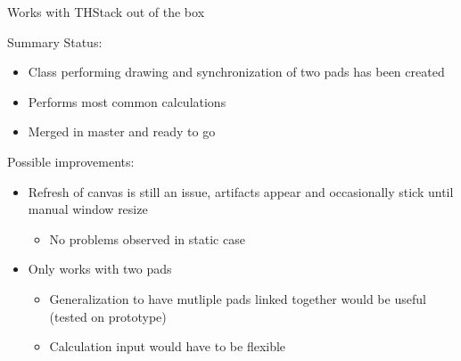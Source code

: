 \documentclass{beamer}
\begin{document}
\begin{frame}[t]{Works with THStack out of the box}
\end{frame}

\begin{frame}[t]{Summary}
  Status:
  \begin{itemize}
    \item Class performing drawing and synchronization of two pads has been created
    \item Performs most common calculations
    \item Merged in master and ready to go
  \end{itemize}
  Possible improvements:
  \begin{itemize}
    \item Refresh of canvas is still an issue, artifacts appear and occasionally stick until manual window resize
      \begin{itemize}
        \item No problems observed in static case
      \end{itemize} 
    \item Only works with two pads
      \begin{itemize}
        \item Generalization to have mutliple pads linked together would be useful (tested on prototype)
        \item Calculation input would have to be flexible
      \end{itemize}
  \end{itemize}
\end{frame}
\end{document}
